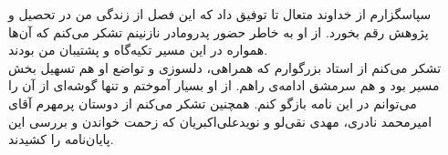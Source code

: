 
سپاسگزارم از خداوند متعال تا توفیق داد که این فصل از زندگی من در تحصیل و پژوهش رقم بخورد. از او به خاطر حضور پدرومادر نازنینم تشکر می‌کنم که آن‌ها همواره در این مسیر تکیه‌گاه و پشتیبان من بودند.\\
تشکر می‌کنم از استاد بزرگوارم که همراهی، دلسوزی و تواضع او هم تسهیل بخش مسیر بود و هم سرمشق ادامه‌ی راهم. از او بسیار آموختم و تنها گوشه‌ای از آن را می‌توانم در این نامه بازگو کنم. همچنین تشکر می‌کنم از دوستان پرمهرم آقای امیرمحمد نادری، مهدی نقی‌لو و نویدعلی‌اکبریان که زحمت خواندن و بررسی این پایان‌نامه را کشیدند.
